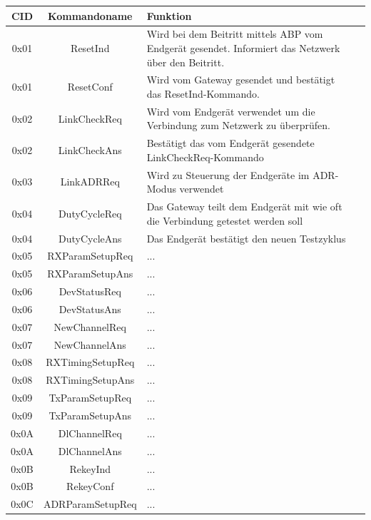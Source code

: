 \documentclass[a4paper,12pt]{article}
\begin{document}
                    
                \begin{longtable}{c |c | p{10.5cm} c}
                    CID & Kommandoname & Funktion \\
                    \hline
                    0x01 & ResetInd & Wird bei dem Beitritt mittels ABP vom Endgerät gesendet. Informiert das Netzwerk über den Beitritt. \\
                    0x01 & ResetConf & Wird vom Gateway gesendet und bestätigt das ResetInd-Kommando. \\
                    0x02 & LinkCheckReq & Wird vom Endgerät verwendet um die Verbindung zum Netzwerk zu überprüfen. \\
                    0x02 & LinkCheckAns & Bestätigt das vom Endgerät gesendete LinkCheckReq-Kommando \\
                    0x03 & LinkADRReq & Wird zu Steuerung der Endgeräte im ADR-Modus verwendet \\
                    0x04 & DutyCycleReq & Das Gateway teilt dem Endgerät mit wie oft die Verbindung getestet werden soll \\
                    0x04 & DutyCycleAns & Das Endgerät bestätigt den neuen Testzyklus \\
                    0x05 & RXParamSetupReq & ... \\
                    0x05 & RXParamSetupAns & ... \\
                    0x06 & DevStatusReq & ... \\
                    0x06 & DevStatusAns & ... \\
                    0x07 & NewChannelReq & ... \\
                    0x07 & NewChannelAns & ... \\
                    0x08 & RXTimingSetupReq & ... \\
                    0x08 & RXTimingSetupAns & ... \\
                    0x09 & TxParamSetupReq & ... \\
                    0x09 & TxParamSetupAns & ... \\
                    0x0A & DlChannelReq & ... \\
                    0x0A & DlChannelAns & ... \\
                    0x0B & RekeyInd & ... \\
                    0x0B & RekeyConf & ... \\
                    0x0C & ADRParamSetupReq & ... \\

\end{longtable}
\end{document}

